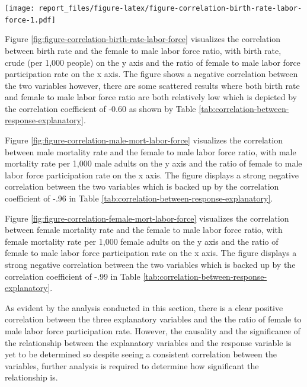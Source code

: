 \documentclass[11pt,a4paper,]{article}
\let\origfigure\figure
\let\endorigfigure\endfigure
\renewenvironment{figure}[1][2] {
    \expandafter\origfigure\expandafter[H]
} {
    \endorigfigure
}%
\begin{document}
\begin{figure}
\centering
\texttt{[image: report\_files/figure-latex/figure-correlation-birth-rate-labor-force-1.pdf]}
\caption{\label{fig:figure-correlation-birth-rate-labor-force}The figure displays the relationship between the percentage results of birth rates per 1000 adult females and the Ratio of female to male labor force participation rate (\%) (national estimate)}
\end{figure}

Figure \ref{fig:figure-correlation-birth-rate-labor-force} visualizes the correlation between birth rate and the female to male labor force ratio, with birth rate, crude (per 1,000 people) on the y axis and the ratio of female to male labor force participation rate on the x axis. The figure shows a negative correlation between the two variables however, there are some scattered results where both birth rate and female to male labor force ratio are both relatively low which is depicted by the correlation coefficient of -0.60 as shown by Table \ref{tab:correlation-between-response-explanatory}.

Figure \ref{fig:figure-correlation-male-mort-labor-force} visualizes the correlation between male mortality rate and the female to male labor force ratio, with male mortality rate per 1,000 male adults on the y axis and the ratio of female to male labor force participation rate on the x axis. The figure displays a strong negative correlation between the two variables which is backed up by the correlation coefficient of -.96 in Table \ref{tab:correlation-between-response-explanatory}.

Figure \ref{fig:figure-correlation-female-mort-labor-force} visualizes the correlation between female mortality rate and the female to male labor force ratio, with female mortality rate per 1,000 female adults on the y axis and the ratio of female to male labor force participation rate on the x axis. The figure displays a strong negative correlation between the two variables which is backed up by the correlation coefficient of -.99 in Table \ref{tab:correlation-between-response-explanatory}.

As evident by the analysis conducted in this section, there is a clear positive correlation between the three explanatory variables and the the ratio of female to male labor force participation rate. However, the causality and the significance of the relationship between the explanatory variables and the response variable is yet to be determined so despite seeing a consistent correlation between the variables, further analysis is required to determine how significant the relationship is.
\end{document}
